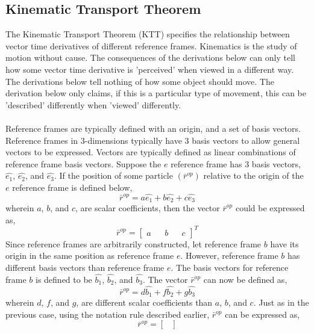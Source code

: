\documentclass[a4paper, 12pt]{report}
\begin{document}
\begin{center}

\chapter{Kinematic Transport Theorem}
\begin{comment}
\end{comment}
The Kinematic Transport Theorem (KTT) specifies the relationship between vector time derivatives of different reference frames. Kinematics is the study of motion without cause. The consequences of the derivations below can only tell how some vector time derivative is 'perceived' when viewed in a different way. The derivations below tell nothing of how some object should move. The derivation below only claims, if this is a particular type of movement, this can be 'described' differently when 'viewed' differently.
\\~\\Reference frames are typically defined with an origin, and a set of basis vectors. Reference frames in $3$-dimensions typically have $3$ basis vectors to allow general vectors to be expressed. Vectors are typically defined as linear combinations of reference frame basis vectors. Suppose the $e$ reference frame has $3$ basis vectors, $\hat{e_{1}}$, $\hat{e_{2}}$, and $\hat{e_{3}}$. If the position of some particle $\left(\bar{r}^{op}\right)$ relative to the origin of the $e$ reference frame is defined below,
$$\bar{r}^{op} = a\hat{e_{1}} + b\hat{e_{2}} + c\hat{e_{3}}$$
wherein $a$, $b$, and $c$, are scalar coefficients, then the vector $\bar{r}^{op}$ could be expressed as,
$$\bar{r}^{op} = \begin{bmatrix}
a && b && c
\end{bmatrix}^{T}$$
Since reference frames are arbitrarily constructed, let reference frame $b$ have its origin in the same position as reference frame $e$. However, reference frame $b$ has different basis vectors than reference frame $e$. The basis vectors for reference frame $b$ is defined to be $\hat{b_{1}}$, $\hat{b_{2}}$, and $\hat{b_{3}}$. The vector $\bar{r}^{op}$ can now be defined as,
$$\bar{r}^{op} = d\hat{b_{1}} + f\hat{b_{2}} + g\hat{b_{3}}$$
wherein $d$, $f$, and $g$, are different scalar coefficients than $a$, $b$, and $c$. Just as in the previous case, using the notation rule described earlier, $\bar{r}^{op}$ can be expressed as,
$$\bar{r}^{op} = \begin{bmatrix}

\end{bmatrix}$$
\end{center}
\end{document}
